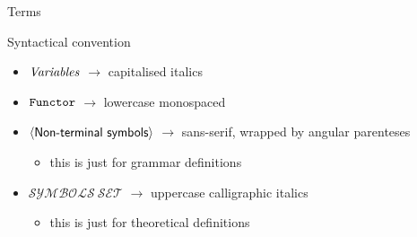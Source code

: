 \documentclass[presentation]{beamer}\mode<presentation>{\usetheme{AMSBolognaFC}}
\begin{document}
\begin{frame}[allowframebreaks]{Terms}
    \begin{block}{Syntactical convention}
        \begin{itemize}
            \item $\mathit{Variables}$ $\rightarrow$ capitalised italics
            \item $\mathtt{Functor}$ $\rightarrow$ lowercase monospaced
            \item $\meta{Non\text{-}terminal\ symbols}$ $\rightarrow$ sans-serif, wrapped by angular parenteses
            \begin{itemize}
                \item this is just for grammar definitions
            \end{itemize}
            \item $\mathcal{SYMBOLS\ SET}$ $\rightarrow$ uppercase calligraphic italics
            \begin{itemize}
                \item this is just for theoretical definitions
            \end{itemize}
        \end{itemize}
    \end{block}
\end{frame}
\end{document}
